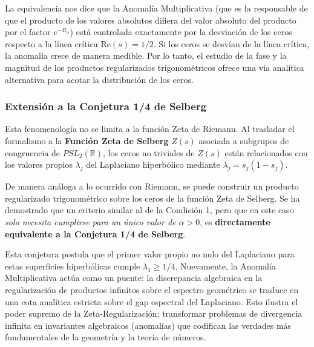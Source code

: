 La equivalencia nos dice que la Anomalía Multiplicativa (que es la responsable de que el producto de los valores absolutos difiera del valor absoluto del producto por el factor $e^{-R_\alpha}$) está controlada exactamente por la desviación de los ceros respecto a la línea crítica $\text{Re}(s) = 1/2$. Si los ceros se desvían de la línea crítica, la anomalía crece de manera medible. Por lo tanto, el estudio de la fase y la magnitud de los productos regularizados trigonométricos ofrece una vía analítica alternativa para acotar la distribución de los ceros.

\subsubsection*{Extensión a la Conjetura 1/4 de Selberg}

Esta fenomenología no se limita a la función Zeta de Riemann. Al trasladar el formalismo a la \textbf{Función Zeta de Selberg} $Z(s)$ asociada a subgrupos de congruencia de $PSL_2(\mathbb{R})$, los ceros no triviales de $Z(s)$ están relacionados con los valores propios $\lambda_j$ del Laplaciano hiperbólico mediante $\lambda_j = s_j(1-s_j)$.

De manera análoga a lo ocurrido con Riemann, se puede construir un producto regularizado trigonométrico sobre los ceros de la función Zeta de Selberg. Se ha demostrado que un criterio similar al de la Condición 1, pero que en este caso \textit{solo necesita cumplirse para un único valor de $\alpha > 0$}, es \textbf{directamente equivalente a la Conjetura 1/4 de Selberg}. 

Esta conjetura postula que el primer valor propio no nulo del Laplaciano para estas superficies hiperbólicas cumple $\lambda_1 \ge 1/4$. Nuevamente, la Anomalía Multiplicativa actúa como un puente: la discrepancia algebraica en la regularización de productos infinitos sobre el espectro geométrico se traduce en una cota analítica estricta sobre el gap espectral del Laplaciano. Esto ilustra el poder supremo de la Zeta-Regularización: transformar problemas de divergencia infinita en invariantes algebraicos (anomalías) que codifican las verdades más fundamentales de la geometría y la teoría de números.
